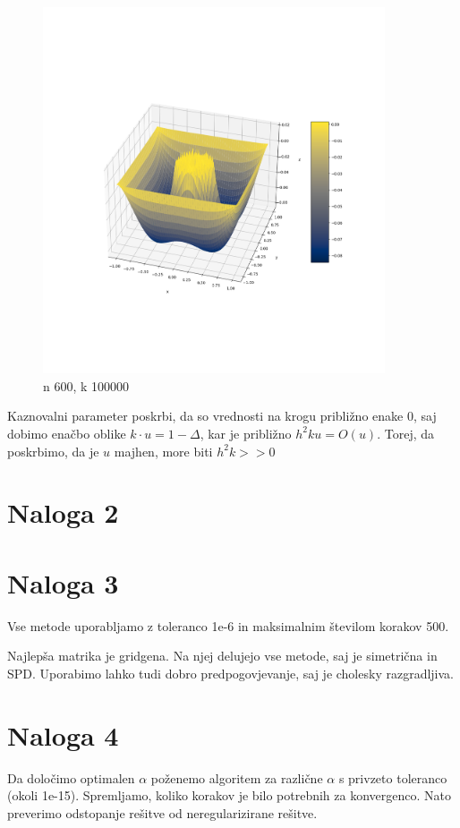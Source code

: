 \documentclass{article}
\begin{document}
    \begin{figure}[h]
        \centering
        \includegraphics[width=0.9\textwidth]{nal1_n600_k100000.png}
        \caption{n 600, k 100000}
    \end{figure}

    Kaznovalni parameter poskrbi, da so vrednosti na krogu približno enake 0, saj dobimo enačbo oblike \(k\cdot u = 1- \Delta \), kar je približno \(h^2 k u = O(u)\). Torej, da poskrbimo, da je \(u\) majhen, more biti \(h^2k>>0\)
    \section{Naloga 2}

    \section{Naloga 3}
    Vse metode uporabljamo z toleranco 1e-6 in maksimalnim številom korakov 500.
    
    Najlepša matrika je gridgena. Na njej delujejo vse metode, saj je simetrična in SPD. Uporabimo lahko tudi dobro predpogovjevanje, saj je cholesky razgradljiva.


    \section{Naloga 4}
    Da določimo optimalen \(\alpha\) poženemo algoritem za različne \(\alpha\) s privzeto toleranco (okoli 1e-15). Spremljamo, koliko korakov je bilo potrebnih za konvergenco. Nato preverimo odstopanje rešitve od neregularizirane rešitve.
\end{document}
